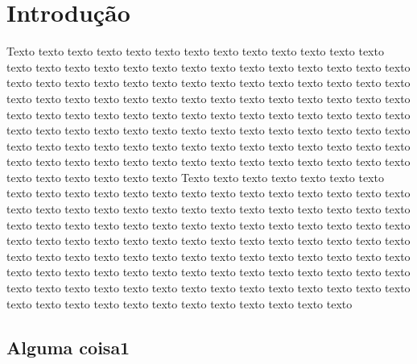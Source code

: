 \chapter{Introdução}
\label{cap:descricao}

Texto texto texto texto texto texto texto texto texto texto texto texto texto
texto texto texto texto texto texto texto texto texto texto texto texto texto
texto texto texto texto texto texto texto texto texto texto texto texto texto
texto texto texto texto texto texto texto texto texto texto texto texto texto
texto texto texto texto texto texto texto texto texto texto texto texto texto 
texto texto texto texto texto texto texto texto texto texto texto texto texto 
texto texto texto texto texto texto texto texto texto texto texto texto texto 
texto texto texto texto texto texto texto texto texto texto texto texto texto 
texto texto texto texto texto texto texto texto texto texto texto texto texto
Texto texto texto texto texto texto texto texto texto texto texto texto texto
texto texto texto texto texto texto texto texto texto texto texto texto texto
texto texto texto texto texto texto texto texto texto texto texto texto texto
texto texto texto texto texto texto texto texto texto texto texto texto texto
texto texto texto texto texto texto texto texto texto texto texto texto texto 
texto texto texto texto texto texto texto texto texto texto texto texto texto 
texto texto texto texto texto texto texto texto texto texto texto texto texto 
texto texto texto texto texto texto texto texto texto texto texto texto texto 
texto texto texto texto texto texto texto texto texto texto texto texto texto

\section{Alguma coisa1}
\label{sec:acidos_nucleicos}

